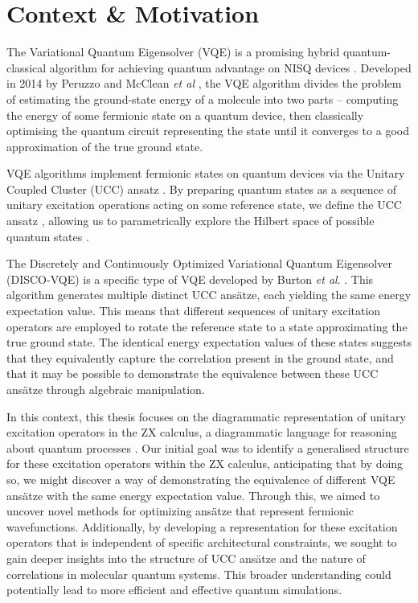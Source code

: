 \section{Context \& Motivation}%
\label{context-motivation}

The Variational Quantum Eigensolver (VQE) is a promising hybrid quantum-classical algorithm for achieving quantum advantage on NISQ devices \cite{Cerezo2020}. Developed in 2014 by Peruzzo and McClean \textit{et al} \cite{Peruzzo2014}, the VQE algorithm divides the problem of estimating the ground-state energy of a molecule into two parts -- computing the energy of some fermionic state on a quantum device, then classically optimising the quantum circuit representing the state until it converges to a good approximation of the true ground state.

VQE algorithms implement fermionic states on quantum devices via the Unitary Coupled Cluster (UCC) ansatz \cite{Taube2006}. By preparing quantum states as a sequence of unitary excitation operations acting on some reference state, we define the UCC ansatz \cite{Burton2023}, allowing us to parametrically explore the Hilbert space of possible quantum states \cite{McClean2016}.

The Discretely and Continuously Optimized Variational Quantum Eigensolver (DISCO-VQE) is a specific type of VQE developed by Burton \textit{et al}. \cite{Burton2023}. This algorithm generates multiple distinct UCC ansätze, each yielding the same energy expectation value. This means that different sequences of unitary excitation operators are employed to rotate the reference state to a state approximating the true ground state. The identical energy expectation values of these states suggests that they equivalently capture the correlation present in the ground state, and that it may be possible to demonstrate the equivalence between these UCC ansätze through algebraic manipulation.

In this context, this thesis focuses on the diagrammatic representation of unitary excitation operators in the ZX calculus, a diagrammatic language for reasoning about quantum processes \cite{Coecke2011}. Our initial goal was to identify a generalised structure for these excitation operators within the ZX calculus, anticipating that by doing so, we might discover a way of demonstrating the equivalence of different VQE ansätze with the same energy expectation value. Through this, we aimed to uncover novel methods for optimizing ansätze that represent fermionic wavefunctions. Additionally, by developing a representation for these excitation operators that is independent of specific architectural constraints, we sought to gain deeper insights into the structure of UCC ansätze and the nature of correlations in molecular quantum systems. This broader understanding could potentially lead to more efficient and effective quantum simulations.

